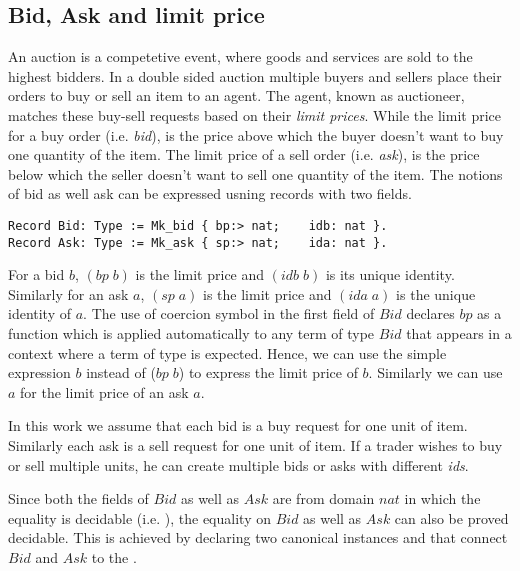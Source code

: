 \documentclass[a4paper,UKenglish,cleveref, autoref]{lipics-v2019}
\begin{document}
\subsection{Bid, Ask and limit price}
An auction is a competetive event, where goods and services are sold to the highest bidders. In  a double sided auction multiple buyers and sellers place their orders to buy or sell an item to an agent. The agent, known as auctioneer, matches these buy-sell requests  based on their \emph{limit prices}. While the limit price for a buy order (i.e. \emph{bid}), is the price above which the buyer doesn't want to buy one quantity of the item. The limit price of a sell order (i.e. \emph{ask}), is the price below which the seller doesn't want to sell one quantity of the item. The notions of bid as well ask can be expressed usning records with two fields. 
\begin{verbatim}
Record Bid: Type := Mk_bid { bp:> nat;    idb: nat }.
Record Ask: Type := Mk_ask { sp:> nat;    ida: nat }.
\end{verbatim}
For a bid $b$, $(bp \; b)$  is the limit price and $(idb \; b)$ is its unique identity. Similarly for an ask $a$, $(sp \; a)$ is the limit price and $(ida \; a)$ is the unique identity of $a$. The use of coercion symbol \tw{ :>} in the first field of $Bid$ declares $bp$ as a function which is applied automatically to any term of type $Bid$ that appears in a context where a term of type  is expected. Hence, we can use the simple expression $b$ instead of  ($bp \;b$) to express the limit price of $b$. Similarly we can use $a$ for the limit price of an ask $a$.
\begin{note*} In this work we assume that each bid is a buy request for one unit of item. Similarly each ask is a sell request for one unit of item. If a trader wishes to buy or sell multiple units, he can create multiple bids or asks with different \emph{ids}. 
\end{note*}

Since both the fields of $Bid$ as well as $Ask$ are from domain $nat$ in which the equality is decidable (i.e. ), the equality on $Bid$ as well as $Ask$ can also be proved  decidable. This is achieved by declaring two canonical instances  and  that connect $Bid$ and $Ask$ to the .  
\end{document}

